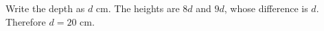 Write the depth as $d$ cm. The heights are $8d$ and $9d$, whose difference is $d$. Therefore $\boxed{d=20\text{ cm}}$.
